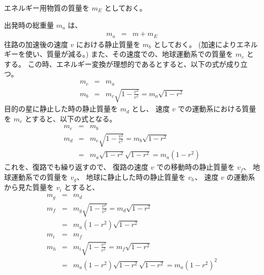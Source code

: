 エネルギー用物質の質量を $m_E$ としておく。

出発時の総重量 $m_a$ は、
  \begin{eqnarray}
    m_a & = & m + m_E
  \end{eqnarray}
往路の加速後の速度 $v$ における静止質量を $m_b$ としておく。
(加速によりエネルギーを使い、質量が減る。)
また、その速度での、地球運動系での質量を $m_c$ とする。
この時、エネルギー変換が理想的であるとすると、以下の式が成り立つ。
  \begin{eqnarray}
    m_c & = & m_a
  \label{eq:m-c-m-a}
  \\
    m_b & = & m_c \sqrt{1 - \frac{v^2}{c^2}} = m_a \sqrt{1 - r^2}
  \label{eq:m-b-m-c-v}
  \end{eqnarray}
目的の星に静止した時の静止質量を $m_d$ とし、
速度 $v$ での運動系における質量を $m_e$ とすると、以下の式となる。
  \begin{eqnarray}
    m_e & = & m_b
  \\
    m_d & = & m_e \sqrt{1 - \frac{v^2}{c^2}} = m_b \sqrt{1 - r^2}
  \\
        & = & m_a \sqrt{1 - r^2} \sqrt{1 - r^2} = m_a (1 - r^2)
  \label{eq:m-d-m-a-r}
  \end{eqnarray}
これを、復路でも繰り返すので、
復路の速度 $v$ での移動時の静止質量を $v_f$、
地球運動系での質量を $v_g$、
地球に静止した時の静止質量を $v_h$、
速度 $v$ の運動系から見た質量を $v_i$ とすると、
  \begin{eqnarray}
    m_g & = & m_d
  \\
    m_f & = & m_g \sqrt{1 - \frac{v^2}{c^2}} = m_d \sqrt{1 - r^2}
  \\
        & = & m_a (1 - r^2) \sqrt{1 - r^2}
  \label{eq:m-f-m-a-r}
  \\
    m_i & = & m_f
  \\
    m_h & = & m_i \sqrt{1 - \frac{v^2}{c^2}} = m_f \sqrt{1 - r^2}
  \\
        & = & m_a (1 - r^2) \sqrt{1 - r^2} \sqrt{1 - r^2} = m_a(1 - r^2)^2
  \label{eq:m-h-m-a-r}
  \end{eqnarray}
